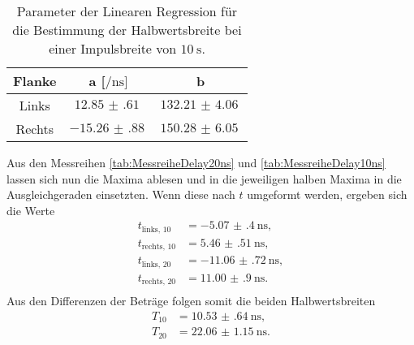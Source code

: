\begin{table}
    \centering
    \caption{Parameter der Linearen Regression für die Bestimmung der Halbwertsbreite bei einer Impulsbreite von $\SI{10}{\second}$.} 
    \label{tab:332211}
    \begin{tabular}{c | c c }
        \toprule
        Flanke & a [$\si{\per\nano\second}] $ & b \\
        \midrule
            Links    &      $\SI{12.85(61)}{}$      &    $\SI{132.21(406)}{}$  \\               
            Rechts    &     $\SI{-15.26(88)}{}$      &  $\SI{150.28(605)}{}$   \\ 
    \end{tabular}
\end{table}

Aus den Messreihen \ref{tab:MessreiheDelay20ns} und \ref{tab:MessreiheDelay10ns} lassen sich nun die Maxima ablesen und in die jeweiligen halben Maxima in die Ausgleichgeraden einsetzten.
Wenn diese nach $t$ umgeformt werden, ergeben sich die Werte
\begin{align*}
t_{\text{links, }10} &= \SI{-5.07(40)}{\nano\second},\\
t_{\text{rechts, }10} &= \SI{5.46(51)}{\nano\second},\\
t_{\text{links, }20} &= \SI{-11.06(72)}{\nano\second},\\
t_{\text{rechts, }20} &= \SI{11.00(90)}{\nano\second}.\\
\end{align*}
Aus den Differenzen der Beträge folgen somit die beiden Halbwertsbreiten
\begin{align*}
T_{10} &= \SI{10.53(64)}{\nano\second},\\
T_{20} &= \SI{22.06(115)}{\nano\second}.\\
\end{align*}